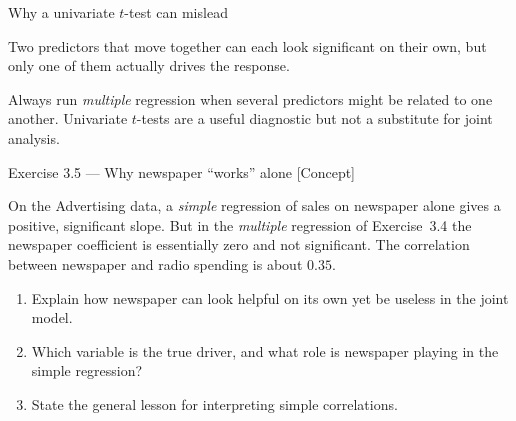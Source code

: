 \documentclass[aspectratio=169,11pt]{beamer}
\begin{document}
\begin{frame}{Why a univariate $t$-test can mislead}
  \begin{takeaway}
    Two predictors that move together can each look significant on
    their own, but only one of them actually drives the response.
  \end{takeaway}
  \begin{readme}
    Always run \emph{multiple} regression when several predictors might
    be related to one another. Univariate $t$-tests are a useful
    diagnostic but not a substitute for joint analysis.
  \end{readme}
\end{frame}

\begin{frame}{Exercise 3.5 --- Why newspaper ``works'' alone [Concept]}
  \begin{exercise}
    On the Advertising data, a \emph{simple} regression of sales on
    newspaper alone gives a positive, significant slope. But in the
    \emph{multiple} regression of Exercise~3.4 the newspaper
    coefficient is essentially zero and not significant. The correlation
    between newspaper and radio spending is about $0.35$.
    \begin{enumerate}
      \item Explain how newspaper can look helpful on its own yet be
            useless in the joint model.
      \item Which variable is the true driver, and what role is
            newspaper playing in the simple regression?
      \item State the general lesson for interpreting simple
            correlations.
    \end{enumerate}
  \end{exercise}
\end{frame}
\end{document}
